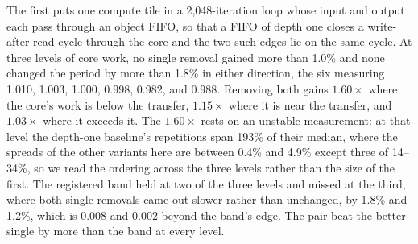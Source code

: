 The first puts one compute tile in a 2{,}048-iteration loop whose input and output each pass through an object FIFO, so that a FIFO of depth one closes a write-after-read cycle through the core and the two such edges lie on the same cycle.
At three levels of core work, no single removal gained more than 1.0\% and none changed the period by more than 1.8\% in either direction, the six measuring 1.010, 1.003, 1.000, 0.998, 0.982, and 0.988. Removing both gains $1.60\times$ where the core's work is below the transfer, $1.15\times$ where it is near the transfer, and $1.03\times$ where it exceeds it. The $1.60\times$ rests on an unstable measurement: at that level the depth-one baseline's repetitions span 193\% of their median, where the spreads of the other variants here are between 0.4\% and 4.9\% except three of 14--34\%, so we read the ordering across the three levels rather than the size of the first.
The registered band held at two of the three levels and missed at the third, where both single removals came out slower rather than unchanged, by 1.8\% and 1.2\%, which is 0.008 and 0.002 beyond the band's edge.
The pair beat the better single by more than the band at every level.

